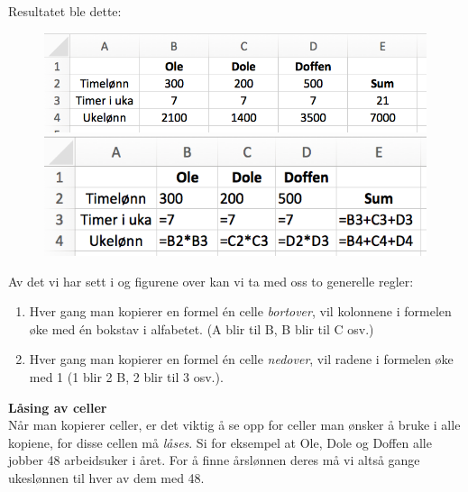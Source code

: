 Resultatet ble dette:
\begin{figure}[H]
	\centering
	\includegraphics[scale=0.3]{figs/ex8}\\[5pt]
	\includegraphics[scale=0.3]{figs/ex15}
\end{figure}
Av det vi har sett i  og figurene over kan vi ta med oss to generelle regler:
\begin{enumerate}
	\item Hver gang man kopierer en formel én celle \textsl{bortover}, vil kolonnene i formelen øke med én bokstav i alfabetet. (A blir til B, B blir til C osv.)
		\item Hver gang man kopierer en formel  én celle \textsl{nedover}, vil radene i formelen øke med 1 (1 blir 2 B, 2 blir til 3 osv.).
\end{enumerate}

\textbf{Låsing av celler}\\[2pt]
Når man kopierer celler, er det viktig å se opp for celler man ønsker å bruke i alle kopiene, for disse cellen må \textit{låses}. Si for eksempel at Ole, Dole og Doffen alle jobber 48 arbeidsuker i året. For å finne årslønnen deres må vi altså gange ukeslønnen til hver av dem med 48. \vsk

